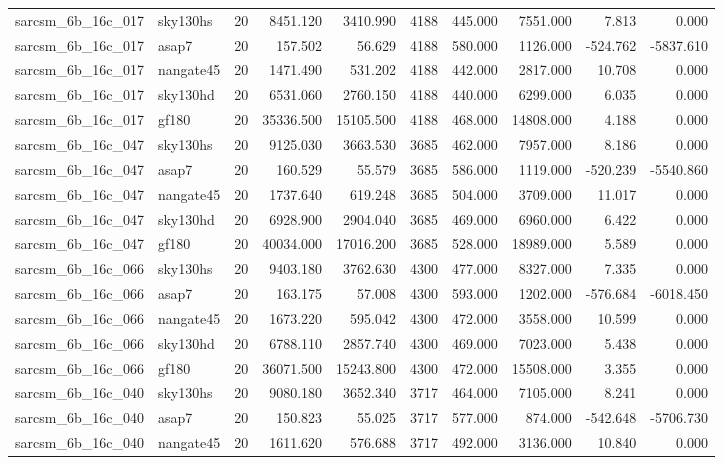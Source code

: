 \begin{longtable}{llrrrrrrrr}
sarcsm\_6b\_16c\_017 & sky130hs & 20 & 8451.120 & 3410.990 & 4188 & 445.000 & 7551.000 & 7.813 & 0.000 \\
sarcsm\_6b\_16c\_017 & asap7 & 20 & 157.502 & 56.629 & 4188 & 580.000 & 1126.000 & -524.762 & -5837.610 \\
sarcsm\_6b\_16c\_017 & nangate45 & 20 & 1471.490 & 531.202 & 4188 & 442.000 & 2817.000 & 10.708 & 0.000 \\
sarcsm\_6b\_16c\_017 & sky130hd & 20 & 6531.060 & 2760.150 & 4188 & 440.000 & 6299.000 & 6.035 & 0.000 \\
sarcsm\_6b\_16c\_017 & gf180 & 20 & 35336.500 & 15105.500 & 4188 & 468.000 & 14808.000 & 4.188 & 0.000 \\
sarcsm\_6b\_16c\_047 & sky130hs & 20 & 9125.030 & 3663.530 & 3685 & 462.000 & 7957.000 & 8.186 & 0.000 \\
sarcsm\_6b\_16c\_047 & asap7 & 20 & 160.529 & 55.579 & 3685 & 586.000 & 1119.000 & -520.239 & -5540.860 \\
sarcsm\_6b\_16c\_047 & nangate45 & 20 & 1737.640 & 619.248 & 3685 & 504.000 & 3709.000 & 11.017 & 0.000 \\
sarcsm\_6b\_16c\_047 & sky130hd & 20 & 6928.900 & 2904.040 & 3685 & 469.000 & 6960.000 & 6.422 & 0.000 \\
sarcsm\_6b\_16c\_047 & gf180 & 20 & 40034.000 & 17016.200 & 3685 & 528.000 & 18989.000 & 5.589 & 0.000 \\
sarcsm\_6b\_16c\_066 & sky130hs & 20 & 9403.180 & 3762.630 & 4300 & 477.000 & 8327.000 & 7.335 & 0.000 \\
sarcsm\_6b\_16c\_066 & asap7 & 20 & 163.175 & 57.008 & 4300 & 593.000 & 1202.000 & -576.684 & -6018.450 \\
sarcsm\_6b\_16c\_066 & nangate45 & 20 & 1673.220 & 595.042 & 4300 & 472.000 & 3558.000 & 10.599 & 0.000 \\
sarcsm\_6b\_16c\_066 & sky130hd & 20 & 6788.110 & 2857.740 & 4300 & 469.000 & 7023.000 & 5.438 & 0.000 \\
sarcsm\_6b\_16c\_066 & gf180 & 20 & 36071.500 & 15243.800 & 4300 & 472.000 & 15508.000 & 3.355 & 0.000 \\
sarcsm\_6b\_16c\_040 & sky130hs & 20 & 9080.180 & 3652.340 & 3717 & 464.000 & 7105.000 & 8.241 & 0.000 \\
sarcsm\_6b\_16c\_040 & asap7 & 20 & 150.823 & 55.025 & 3717 & 577.000 & 874.000 & -542.648 & -5706.730 \\
sarcsm\_6b\_16c\_040 & nangate45 & 20 & 1611.620 & 576.688 & 3717 & 492.000 & 3136.000 & 10.840 & 0.000 \\

\end{longtable}
